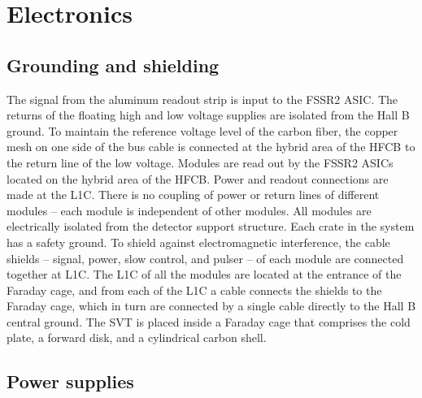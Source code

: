 \section{Electronics}

\subsection{Grounding and shielding}

The signal from the aluminum readout strip is input to the FSSR2 ASIC. The returns of the floating high and low voltage supplies are isolated from the Hall B ground. To maintain the reference voltage level of the carbon fiber, the copper mesh on one side of the bus cable is connected at the hybrid area of the HFCB to the return line of the low voltage. Modules are read out by the FSSR2 ASICs located on the hybrid area of the HFCB. Power and readout connections are made at the L1C. There is no coupling of power or return lines of different modules -- each module is independent of other modules. All modules are electrically isolated from the detector support structure. 
Each crate in the system has a safety ground. To shield against electromagnetic interference, the cable shields -- signal, power, slow control, and pulser -- of each module are connected together at L1C. The L1C of all the modules are located at the entrance of the Faraday cage, and from each of the L1C a cable connects the shields to the Faraday cage, which in turn are connected by a single cable directly to the Hall B central ground. The SVT is placed inside a Faraday cage that comprises the cold plate, a forward disk, and a cylindrical carbon shell.

\subsection{Power supplies}

